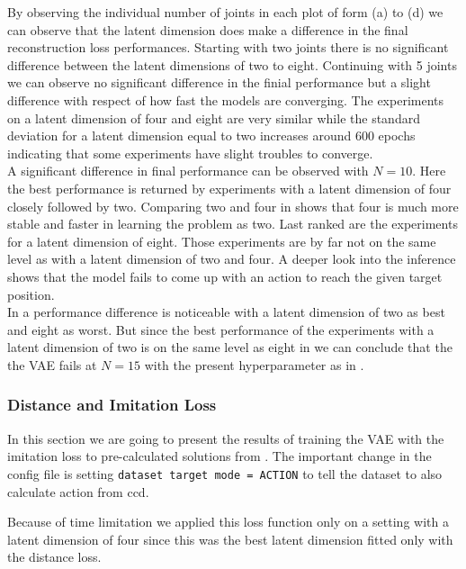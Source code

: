 By observing the individual number of joints in each plot of  form (a) to (d) we can observe that the latent dimension does make a difference in the final reconstruction loss performances. Starting with two joints there is no significant difference between the latent dimensions of two to eight. Continuing with 5 joints we can observe no significant difference in the finial performance but a slight difference with respect of how fast the models are converging. The experiments on a latent dimension of four and eight are very similar while the standard deviation for a latent dimension equal to two increases around 600 epochs indicating that some experiments have slight troubles to converge. \\
A significant difference in final performance can be observed with $N = 10$. Here the best performance is returned by experiments with a latent dimension of four closely followed by two. Comparing two and four in  shows that four is much more stable and faster in learning the problem as two. Last ranked are the experiments for a latent dimension of eight. Those experiments are by far not on the same level as with a latent dimension of two and four. A deeper look into the inference shows that the model fails to come up with an action to reach the given target position.\\
In  a performance difference is noticeable with a latent dimension of two as best and eight as worst. But since the best performance of the experiments with a latent dimension of two is on the same level as eight in  we can conclude that the the VAE fails at $N = 15$ with the present hyperparameter as in .

\subsubsection{Distance and Imitation Loss}

In this section we are going to present the results of training the VAE with the imitation loss to pre-calculated solutions from . The important change in the config file is setting \texttt{dataset target mode = ACTION} to tell the dataset to also calculate action from ccd.  

Because of time limitation we applied this loss function only on a setting with a latent dimension of four since this was the best latent dimension fitted only with the distance loss. 

